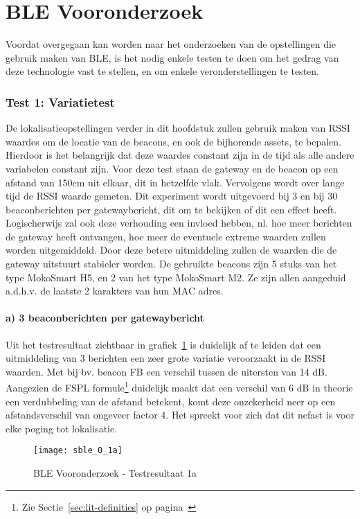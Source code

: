 \section{BLE Vooronderzoek}
\label{sec:ond-ble-0}
Voordat overgegaan kan worden naar het onderzoeken van de opstellingen die gebruik maken van BLE, is het nodig enkele testen te doen om het gedrag van deze technologie vast te stellen, en om enkele veronderstellingen te testen.

\subsubsection{Test 1: Variatietest}
\label{sec:ond-ble-0-1}
De lokalisatieopstellingen verder in dit hoofdstuk zullen gebruik maken van RSSI waardes om de locatie van de beacons, en ook de bijhorende assets, te bepalen. Hierdoor is het belangrijk dat deze waardes constant zijn in de tijd als alle andere variabelen constant zijn. 
Voor deze test staan de gateway en de beacon op een afstand van 150cm uit elkaar, dit in hetzelfde vlak. Vervolgens wordt over lange tijd de RSSI waarde gemeten. Dit experiment wordt uitgevoerd bij 3 en bij 30 beaconberichten per gatewaybericht, dit om te bekijken of dit een effect heeft. Logischerwijs zal ook deze verhouding een invloed hebben, nl. hoe meer berichten de gateway heeft ontvangen, hoe meer de eventuele extreme waarden zullen worden uitgemiddeld. Door deze betere uitmiddeling zullen de waarden die de gateway uitstuurt stabieler worden.
De gebruikte beacons zijn 5 stuks van het type MokoSmart H5, en 2 van het type MokoSmart M2. Ze zijn allen aangeduid a.d.h.v. de laatste 2 karakters van hun MAC adres.

\paragraph{a) 3 beaconberichten per gatewaybericht}
Uit het testresultaat zichtbaar in grafiek~\ref{fig:ond-ble-1a-res} is duidelijk af te leiden dat een uitmiddeling van 3 berichten een zeer grote variatie veroorzaakt in de RSSI waarden. Met bij bv. beacon FB een verschil tussen de uitersten van 14 dB. Aangezien de FSPL formule\footnote{Zie Sectie~\ref{sec:lit-definities} op pagina~\pageref{sec:lit-definities}} duidelijk maakt dat  een verschil van 6 dB in theorie een verdubbeling van de afstand betekent, komt deze onzekerheid neer op een afstandsverschil van ongeveer factor 4. Het spreekt voor zich dat dit nefast is voor elke poging tot lokalisatie.

\begin{figure}[h]
	\texttt{[image: sble\_0\_1a]}
	\caption{BLE Vooronderzoek - Testresultaat 1a}
	\label{fig:ond-ble-1a-res}
\end{figure}

